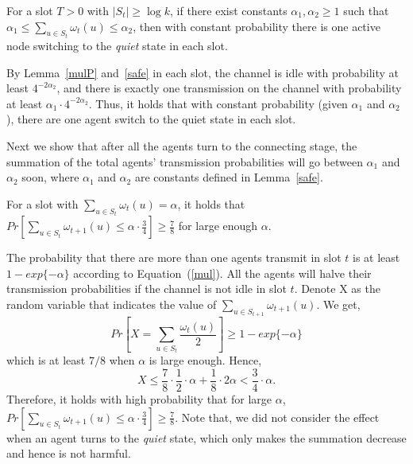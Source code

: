 \begin{lemma}
    \label{safe}
    For a slot $T>0$ with $|S_t| \ge \log k$, if 
    there exist constants $\alpha_1, \alpha_2 \ge 1$ such that
    $\alpha_1 \leq \sum_{u\in S_t}{\omega}_t(u) \leq \alpha_2$, then with constant probability 
    there is one active node switching to the \emph{quiet} state
    in each slot. 
\end{lemma}
\begin{IEEEproof}
    By Lemma~\ref{mulP} and~\ref{safe} in each slot, the channel is idle with probability at least 
    $4^{-2\alpha_2}$, and there is exactly one transmission on the channel
    with probability at least $\alpha_1\cdot 4^{-2\alpha_2}$. Thus, 
    it holds that with constant probability (given $\alpha_1$ and $\alpha_2$),
    there are one agent switch to the quiet state in each slot.
\end{IEEEproof}

Next we show that after all the agents turn to the connecting stage, 
the summation of the total agents' transmission probabilities will go
between $\alpha_1$ and $\alpha_2$ soon, where $\alpha_1$ and $\alpha_2$
are constants defined in Lemma~\ref{safe}.
\begin{lemma}
    \label{lemma7}
    For a slot with ${\sum}_{u\in S_t}\omega_t(u)=\alpha$, it holds that
    $Pr[{\sum}_{u\in S_t}\omega_{t+1}(u) \leq \alpha\cdot\frac{3}{4}] 
    \geq \frac{7}{8}$
    for large enough $\alpha$.
\end{lemma}
\begin{IEEEproof}
    The probability that there are more than one agents transmit in slot 
    $t$ is at least $1-exp\{-\alpha\}$ according to Equation~(\ref{mul}).
    All the agents will halve their transmission probabilities if the channel is 
    not idle in slot $t$. Denote X as the random variable that indicates the value of 
    ${\sum}_{u\in S_{t+1}}\omega_{t+1}(u)$. We get,
    \begin{equation*}
        Pr[X ={\sum}_{u\in S_t}\frac{\omega_t(u)}{2}] 
        \geq 1 - exp\{-\alpha\}
    \end{equation*}
    which is at least $7/8$ when $\alpha$ is large enough. Hence,
    \begin{equation*}
        X \leq \frac{7}{8}\cdot\frac{1}{2}\cdot\alpha + 
        \frac{1}{8}\cdot 2\alpha 
        < \frac{3}{4}\cdot\alpha.
    \end{equation*}
    Therefore, it holds with high probability that for large $\alpha$, $Pr[{\sum}_{u\in S_t}\omega_{t+1}(u) 
    \leq \alpha\cdot\frac{3}{4}] \geq \frac{7}{8}$.
    Note that, 
    we did not consider the effect when an agent turns to the \emph{quiet} state,
    which only makes the summation decrease and hence is not harmful. 
\end{IEEEproof}

